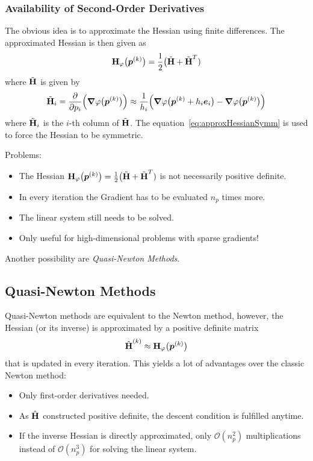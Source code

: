 			\subsubsection{Availability of Second-Order Derivatives}
				The obvious idea is to approximate the Hessian using finite differences. The approximated Hessian is then given as
				\begin{align*}
					\bm{\mathrm{H}}_\varphi\big(\bm{p}^{(k)}\big) = \frac{1}{2} \big( \tilde{\bm{\mathrm{H}}} + \tilde{\bm{\mathrm{H}}}^T )  \label{eq:approxHessianSymm}
				\end{align*}
				where \(\tilde{\bm{\mathrm{H}}}\) is given by
				\begin{align*}
					\tilde{\bm{\mathrm{H}}}_i = \pdv{p_i} \Big( \grad{\varphi}\big(\bm{p}^{(k)}\big) \Big) \approx \frac{1}{h_i} \Big( \grad{\varphi}\big(\bm{p}^{(k)} + h_i \bm{e}_i\big) - \grad{\varphi}\big(\bm{p}^{(k)}\big) \Big)
				\end{align*}
				where \( \tilde{\bm{\mathrm{H}}}_i \) is the \(i\)-th column of \(\tilde{\bm{\mathrm{H}}}\). The equation~\eqref{eq:approxHessianSymm} is used to force the Hessian to be symmetric.

				Problems:
				\begin{itemize}
					\item The Hessian \( \bm{\mathrm{H}}_\varphi\big(\bm{p}^{(k)}\big) = \frac{1}{2} \big( \tilde{\bm{\mathrm{H}}} + \tilde{\bm{\mathrm{H}}}^T ) \) is not necessarily positive definite.
					\item In every iteration the Gradient has to be evaluated \(n_p\) times more.
					\item The linear system still needs to be solved.
					\item Only useful for high-dimensional problems with sparse gradients!
				\end{itemize}
				Another possibility are \emph{Quasi-Newton Methods}.

		\subsection{Quasi-Newton Methods}
			Quasi-Newton methods are equivalent to the Newton method, however, the Hessian (or its inverse) is approximated by a positive definite matrix
			\begin{align*}
				\hat{\bm{\mathrm{H}}}^{(k)} \approx \bm{\mathrm{H}}_\varphi\big(\bm{p}^{(k)}\big)
			\end{align*}
			that is updated in every iteration. This yields a lot of advantages over the classic Newton method:
			\begin{itemize}
				\item Only first-order derivatives needed.
				\item As \( \hat{\bm{\mathrm{H}}} \) constructed positive definite, the descent condition is fulfilled anytime.
				\item If the inverse Hessian is directly approximated, only \( \mathcal{O}(n_p^2) \) multiplications instead of \( \mathcal{O}(n_p^3) \) for solving the linear system.
			\end{itemize}


